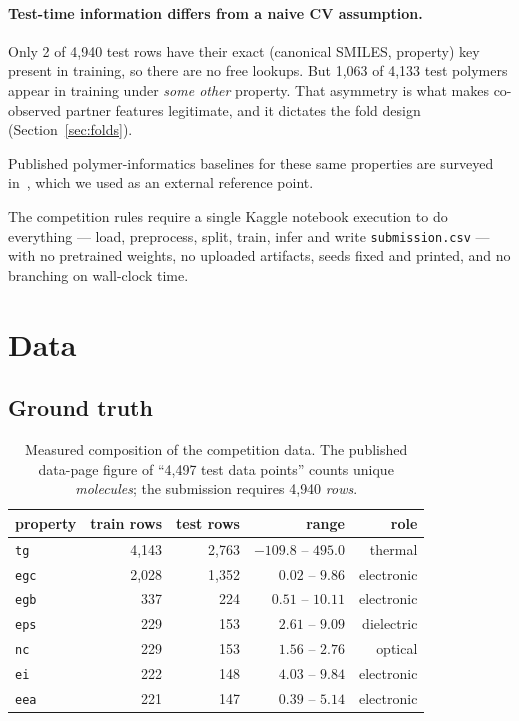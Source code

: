 \documentclass[11pt,a4paper]{article}
\newcommand{\prop}[1]{\texttt{#1}}
\begin{document}
\paragraph{Test-time information differs from a naive CV assumption.} Only 2 of
4{,}940 test rows have their exact (canonical SMILES, property) key present in
training, so there are no free lookups. But 1{,}063 of 4{,}133 test polymers
appear in training under \emph{some other} property. That asymmetry is what
makes co-observed partner features legitimate, and it dictates the fold design
(Section~\ref{sec:folds}).

Published polymer-informatics baselines for these same properties are surveyed
in~\cite{tran2020}, which we used as an external reference point.

The competition rules require a single Kaggle notebook execution to do
everything --- load, preprocess, split, train, infer and write
\texttt{submission.csv} --- with no pretrained weights, no uploaded artifacts,
seeds fixed and printed, and no branching on wall-clock time.

\section{Data}

\subsection{Ground truth}

\begin{table}[h]
\centering
\small
\begin{tabular}{lrrrr}
\toprule
property & train rows & test rows & range & role \\
\midrule
\prop{tg}  & 4{,}143 & 2{,}763 & $-109.8$ -- $495.0$ & thermal \\
\prop{egc} & 2{,}028 & 1{,}352 & $0.02$ -- $9.86$   & electronic \\
\prop{egb} &   337 &   224 & $0.51$ -- $10.11$  & electronic \\
\prop{eps} &   229 &   153 & $2.61$ -- $9.09$   & dielectric \\
\prop{nc}  &   229 &   153 & $1.56$ -- $2.76$   & optical \\
\prop{ei}  &   222 &   148 & $4.03$ -- $9.84$   & electronic \\
\prop{eea} &   221 &   147 & $0.39$ -- $5.14$   & electronic \\
\bottomrule
\end{tabular}
\caption{Measured composition of the competition data. The published data-page
figure of ``4{,}497 test data points'' counts unique \emph{molecules}; the
submission requires 4{,}940 \emph{rows}.}
\end{table}
\end{document}
